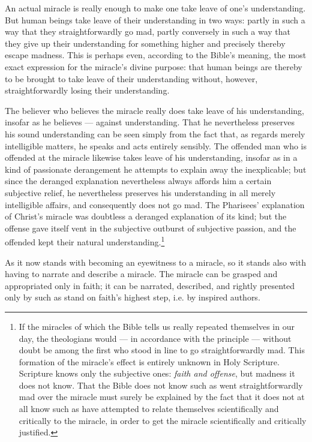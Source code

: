 \documentclass[12pt,a4paper]{book}
\begin{document}
An actual miracle is really enough to make one take leave of one's understanding.
But human beings take leave of their understanding in two ways: partly in such a
way that they straightforwardly go mad, partly conversely in such a way that they
give up their understanding for something higher and precisely thereby escape
madness. This is perhaps even, according to the Bible's meaning, the most exact
expression for the miracle's divine purpose: that human beings are thereby to be
brought to take leave of their understanding without, however, straightforwardly
losing their understanding.

The believer who believes the miracle really does take leave of his understanding,
insofar as he believes --- against understanding. That he nevertheless preserves
his sound understanding can be seen simply from the fact that, as regards merely
intelligible matters, he speaks and acts entirely sensibly. The offended man who is
offended at the miracle likewise takes leave of his understanding, insofar as in a
kind of passionate derangement he attempts to explain away the inexplicable; but
since the deranged
explanation nevertheless always affords him a certain subjective relief, he
nevertheless preserves his understanding in all merely intelligible affairs, and
consequently does not go mad. The Pharisees' explanation of Christ's miracle was
doubtless a deranged explanation of its kind; but the offense gave itself vent in
the subjective outburst of subjective passion, and the offended kept their natural
understanding.\footnote{If the miracles of which the Bible tells us really repeated
themselves in our day, the theologians would --- in accordance with the principle
--- without doubt be among the first who stood in line to go straightforwardly mad.
This formation of the miracle's effect is entirely unknown in Holy Scripture.
Scripture knows only the subjective ones: \emph{faith and offense}, but madness it
does not know. That the Bible does not know such as went straightforwardly mad over
the miracle must surely be explained by the fact that it does not at all know such
as have attempted to relate themselves scientifically and critically to the
miracle, in order to get the miracle scientifically and critically justified.}

As it now stands with becoming an eyewitness to a miracle, so it stands also with
having to narrate and describe a miracle. The miracle can be grasped and
appropriated only in faith; it can be narrated, described, and rightly presented
only by such as stand on faith's highest step, i.e. by inspired authors.
\end{document}
